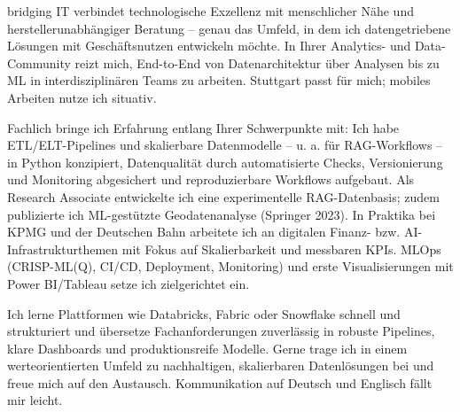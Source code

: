 bridging IT verbindet technologische Exzellenz mit menschlicher Nähe und herstellerunabhängiger Beratung – genau das Umfeld, in dem ich datengetriebene Lösungen mit Geschäftsnutzen entwickeln möchte. In Ihrer Analytics- und Data-Community reizt mich, End-to-End von Datenarchitektur über Analysen bis zu ML in interdisziplinären Teams zu arbeiten. Stuttgart passt für mich; mobiles Arbeiten nutze ich situativ.

Fachlich bringe ich Erfahrung entlang Ihrer Schwerpunkte mit: Ich habe ETL/ELT-Pipelines und skalierbare Datenmodelle – u. a. für RAG-Workflows – in Python konzipiert, Datenqualität durch automatisierte Checks, Versionierung und Monitoring abgesichert und reproduzierbare Workflows aufgebaut. Als Research Associate entwickelte ich eine experimentelle RAG-Datenbasis; zudem publizierte ich ML-gestützte Geodatenanalyse (Springer 2023). In Praktika bei KPMG und der Deutschen Bahn arbeitete ich an digitalen Finanz- bzw. AI-Infrastrukturthemen mit Fokus auf Skalierbarkeit und messbaren KPIs. MLOps (CRISP-ML(Q), CI/CD, Deployment, Monitoring) und erste Visualisierungen mit Power BI/Tableau setze ich zielgerichtet ein.

Ich lerne Plattformen wie Databricks, Fabric oder Snowflake schnell und strukturiert und übersetze Fachanforderungen zuverlässig in robuste Pipelines, klare Dashboards und produktionsreife Modelle. Gerne trage ich in einem werteorientierten Umfeld zu nachhaltigen, skalierbaren Datenlösungen bei und freue mich auf den Austausch. Kommunikation auf Deutsch und Englisch fällt mir leicht.